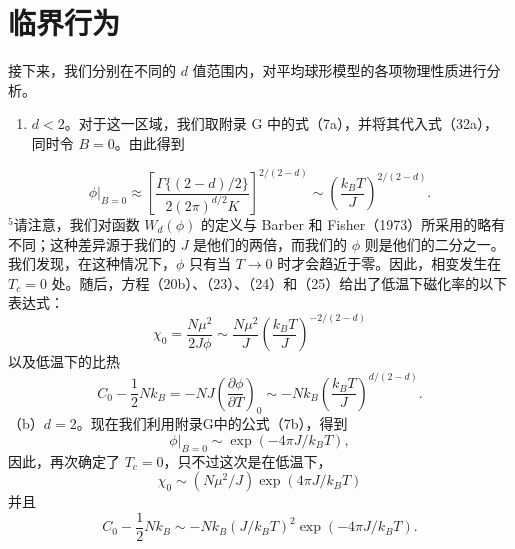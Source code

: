 \section{临界行为}\label{ux4e34ux754cux884cux4e3a}
接下来，我们分别在不同的 \(d\) 值范围内，对平均球形模型的各项物理性质进行分析。
\begin{enumerate}
\def\labelenumi{(\alph{enumi})}
\item
  \(d<2\)。对于这一区域，我们取附录 G 中的式（7a），并将其代入式（32a），同时令 \(B=0\)。由此得到
\end{enumerate}
\begin{equation}\tag{13.4.63}\label{eq:13.4.63}
\phi | _ { B = 0 } \approx \left[ \frac { \Gamma \{ ( 2 - d ) / 2 \} } { 2 ( 2 \pi ) ^{d / 2} K } \right] ^{2 / ( 2 - d )} \sim \left( \frac { k _ { B } T } { J } \right) ^{2 / ( 2 - d )} .
\end{equation}
\(^{5}\)请注意，我们对函数 \(W_{d}(\phi)\) 的定义与 Barber 和 Fisher（1973）所采用的略有不同；这种差异源于我们的 \(J\) 是他们的两倍，而我们的 \(\phi\) 则是他们的二分之一。
我们发现，在这种情况下，\(\phi\) 只有当 \(T \to 0\) 时才会趋近于零。因此，相变发生在 \(T_c = 0\) 处。随后，方程（20b）、（23）、（24）和（25）给出了低温下磁化率的以下表达式：
\begin{equation}\tag{13.4.64}\label{eq:13.4.64}
\chi _ { 0 } = \frac { N \mu ^{2} } { 2 J \phi } \sim \frac { N \mu ^{2} } { J } \left( \frac { k _ { B } T } { J } \right) ^{- 2 / ( 2 - d )}
\end{equation}
以及低温下的比热
\begin{equation}\tag{13.4.65}\label{eq:13.4.65}
C _ { 0 } - \frac { 1 } { 2 } N k _ { B } = - N J \left( \frac { \partial \phi } { \partial T } \right) _ { 0 } \sim - N k _ { B } \left( \frac { k _ { B } T } { J } \right) ^{d / ( 2 - d )} .
\end{equation}
（b）\(d=2\)。现在我们利用附录G中的公式（7b），得到
\begin{equation}\tag{13.4.66}\label{eq:13.4.66}
\phi | _ { B = 0 } \sim \exp ( - 4 \pi J / k _ { B } T ) ,
\end{equation}
因此，再次确定了 \(T_{c} = 0\)，只不过这次是在低温下，
\begin{equation}\tag{13.4.67}\label{eq:13.4.67}
\chi _ { 0 } \sim ( N \mu ^{2} / J ) \exp ( 4 \pi J / k _ { B } T )
\end{equation}
并且
\begin{equation}\tag{13.4.68}\label{eq:13.4.68}
C _ { 0 } - \frac { 1 } { 2 } N k _ { B } \sim - N k _ { B } ( J / k _ { B } T ) ^{2} \exp ( - 4 \pi J / k _ { B } T ) .
\end{equation}
